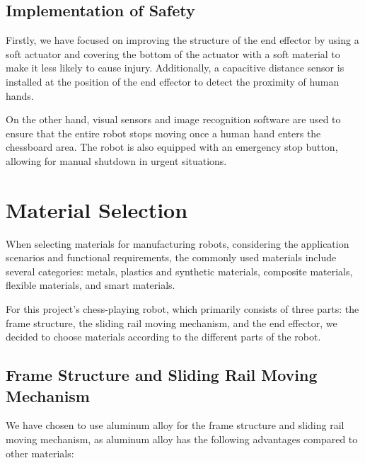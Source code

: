 \documentclass[10pt, a4paper, twocolumn]{article}
\begin{document}
\subsection{Implementation of Safety}
Firstly, we have focused on improving the structure of the end effector by using a soft actuator and covering the bottom of the actuator with a soft material to make it less likely to cause injury. Additionally, a capacitive distance sensor is installed at the position of the end effector to detect the proximity of human hands.

On the other hand, visual sensors and image recognition software are used to ensure that the entire robot stops moving once a human hand enters the chessboard area. The robot is also equipped with an emergency stop button, allowing for manual shutdown in urgent situations.

\section{Material Selection}
When selecting materials for manufacturing robots, considering the application scenarios and functional requirements, the commonly used materials include several categories: metals, plastics and synthetic materials, composite materials, flexible materials, and smart materials.

For this project's chess-playing robot, which primarily consists of three parts: the frame structure, the sliding rail moving mechanism, and the end effector, we decided to choose materials according to the different parts of the robot.

\subsection{Frame Structure and Sliding Rail Moving Mechanism}
We have chosen to use aluminum alloy for the frame structure and sliding rail moving mechanism, as aluminum alloy has the following advantages compared to other materials:
\end{document}
